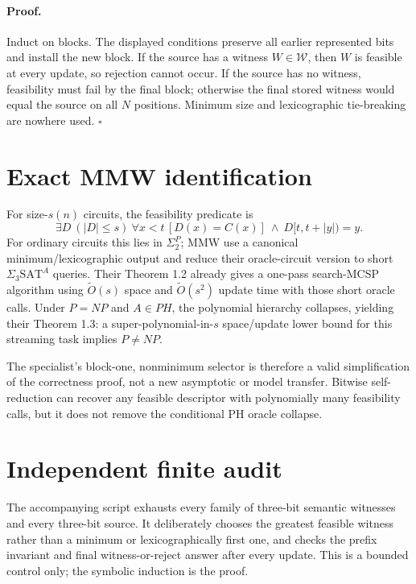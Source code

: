 \documentclass[11pt]{article}
\begin{document}
\paragraph{Proof.}
Induct on blocks.  The displayed conditions preserve all earlier represented bits and install the new block.  If the source has a witness $W\in\mathcal W$, then $W$ is feasible at every update, so rejection cannot occur.  If the source has no witness, feasibility must fail by the final block; otherwise the final stored witness would equal the source on all $N$ positions.  Minimum size and lexicographic tie-breaking are nowhere used. \hfill$\square$

\section*{Exact MMW identification}
For size-$s(n)$ circuits, the feasibility predicate is
\[
 \exists D\ (|D|\le s)\ \forall x<t\,[D(x)=C(x)]\ \wedge\ D[t,t+|y|)=y.
\]
For ordinary circuits this lies in $\Sigma_2^P$; MMW use a canonical minimum/lexicographic output and reduce their oracle-circuit version to short $\Sigma_3\mathrm{SAT}^A$ queries.  Their Theorem 1.2 already gives a one-pass search-MCSP algorithm using $\widetilde O(s)$ space and $\widetilde O(s^2)$ update time with those short oracle calls.  Under $P=NP$ and $A\in PH$, the polynomial hierarchy collapses, yielding their Theorem 1.3: a super-polynomial-in-$s$ space/update lower bound for this streaming task implies $P\ne NP$.

The specialist's block-one, nonminimum selector is therefore a valid simplification of the correctness proof, not a new asymptotic or model transfer.  Bitwise self-reduction can recover any feasible descriptor with polynomially many feasibility calls, but it does not remove the conditional PH oracle collapse.

\section*{Independent finite audit}
The accompanying script exhausts every family of three-bit semantic witnesses and every three-bit source.  It deliberately chooses the greatest feasible witness rather than a minimum or lexicographically first one, and checks the prefix invariant and final witness-or-reject answer after every update.  This is a bounded control only; the symbolic induction is the proof.
\end{document}
